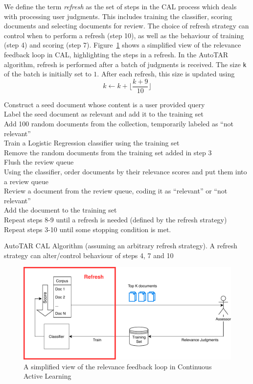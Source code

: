 We define the term \textit{refresh} as the set of steps in the CAL process which
deals with processing user judgments. This includes training the classifier,
scoring documents and selecting documents for review. The choice of refresh
strategy can control when to perform a refresh (step 10), as well as the
behaviour of training (step 4) and scoring (step 7). Figure~\ref{fig:calloop}
shows a simplified view of the relevance feedback loop in CAL, highlighting the
steps in a refresh. In the AutoTAR algorithm, refresh is performed after a batch
of judgments is received.  The size \texttt{k} of the batch is initially set to
$1$. After each refresh, this size is updated using
\begin{equation*}
k \leftarrow k + \lfloor\frac{k + 9}{10}\rfloor
\end{equation*}

\begin{algorithm}[]
Construct a seed document whose content is a user provided query\\
Label the seed document as relevant and add it to the training set \\
Add 100 random documents from the collection, temporarily labeled as ``not
relevant'' \\
Train a Logistic Regression classifier using the training set \\
Remove the random documents from the training set added in step 3 \\
Flush the review queue \\
Using the classifier, order documents by their relevance scores and put them
into a review queue \\ Review a document from the review queue, coding it as
``relevant'' or ``not relevant'' \\
Add the document to the training set \\
Repeat steps 8-9 until a refresh is needed (defined by the refresh strategy) \\
Repeat steps 3-10 until some stopping condition is met.
\caption{AutoTAR CAL Algorithm (assuming an arbitrary refresh strategy). A refresh
strategy can alter/control behaviour of steps 4, 7 and 10}
\label{alg.cal}
\end{algorithm}

\begin{figure}
 \centering 
 \includegraphics[width=1.0\textwidth]{talk_sigir/animation/3.pdf}
 \caption{A simplified view of the relevance feedback loop in Continuous Active
 Learning}
 \label{fig:calloop}
\end{figure}


